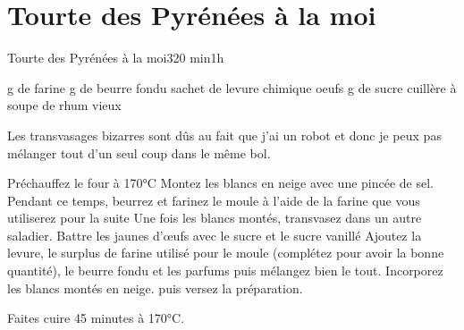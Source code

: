 {\section{Tourte des Pyrénées à la moi}
\begin{recette}{Tourte des Pyrénées à la moi}{3}{20 min}{1h}
\begin{ingredients}
 g de farine
 g de beurre fondu
 sachet de levure chimique
 oeufs
 g de sucre
 cuillère à soupe de rhum vieux
\end{ingredients}

\begin{remarque}
Les transvasages bizarres sont dûs au fait que j'ai un robot et donc je peux pas mélanger tout d'un seul coup dans le même bol.
\end{remarque}


\begin{preparation}
\etape Préchauffez le four à 170°C
\etape Montez les blancs en neige avec une pincée de sel. 
\etape Pendant ce temps, beurrez et farinez le moule à l'aide de la farine que vous utiliserez pour la suite
\etape Une fois les blancs montés, transvasez dans un autre saladier.
\etape Battre les jaunes d'œufs avec le sucre et le sucre vanillé
\etape Ajoutez la levure, le surplus de farine utilisé pour le moule (complétez pour avoir la bonne quantité), le beurre fondu et les parfums puis mélangez bien le tout.
\etape Incorporez les blancs montés en neige.
\etape puis versez la préparation.
\end{preparation}

\begin{cuisson}
Faites cuire 45 minutes à 170°C.
\end{cuisson}
\end{recette}


}%
